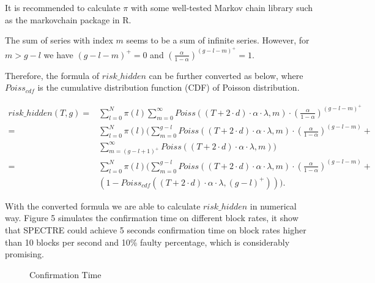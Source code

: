 \documentclass[a4paper,11pt]{article}
\begin{document}
It is recommended to calculate $\pi$ with some well-tested Markov chain library such
as the markovchain package in R.

The sum of series with index $m$ seems to be a sum of infinite series. However,
for $m > g - l$ we have $(g - l - m)^+ = 0$ and
$\left(\frac{\alpha}{1-\alpha}\right)^{(g - l - m)^+} = 1$.

Therefore, the formula of $risk\_hidden$ can be further converted as below,
where $Poiss_{cdf}$ is the cumulative distribution function (CDF) of Poisson
distribution.

\begin{align*}
risk\_hidden(T,g)
=& \sum_{l=0}^{N}\pi(l)\sum_{m=0}^{\infty}Poiss((T+2 \cdot d) \cdot \alpha \cdot \lambda, m) \cdot (\frac{\alpha}{1-\alpha})^{(g-l-m)^+} \\
=& \sum_{l=0}^{N}\pi(l) (\sum_{m=0}^{g-l}Poiss((T+2 \cdot d) \cdot \alpha
	\cdot \lambda, m) \cdot (\frac{\alpha}{1-\alpha})^{(g-l-m)} + \\
& \sum_{m=(g-l+1)^+}^{\infty}Poiss((T+2 \cdot d) \cdot \alpha \cdot \lambda, m)) \\
=& \sum_{l=0}^{N}\pi(l) ( \sum_{m=0}^{g-l}Poiss((T+2 \cdot d) \cdot
	\alpha \cdot \lambda, m) \cdot (\frac{\alpha}{1-\alpha})^{(g-l-m)} + \\
& (1 - Poiss_{cdf} ((T+2 \cdot d) \cdot \alpha \cdot \lambda, (g-l)^+))).
\end{align*}

With the converted formula we are able to calculate $risk\_hidden$ in numerical way. Figure 5 simulates the confirmation time on different block rates, it show that SPECTRE could achieve 5 seconds confirmation time on block rates higher than 10 blocks per second and 10\% faulty percentage, which is considerably promising.

\begin{figure}[ht]
	\centerline{%
	}
\caption{Confirmation Time}
\end{figure}
\end{document}
